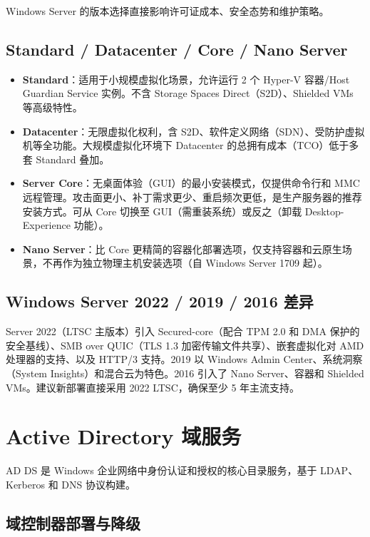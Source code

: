 \documentclass[12pt,UTF8]{ctexbook}
\begin{document}
Windows Server 的版本选择直接影响许可证成本、安全态势和维护策略。
    \subsection{Standard / Datacenter / Core / Nano Server}

\begin{itemize}
	\item \textbf{Standard}：适用于小规模虚拟化场景，允许运行 2 个 Hyper-V 容器/Host Guardian Service 实例。不含 Storage Spaces Direct（S2D）、Shielded VMs 等高级特性。
	\item \textbf{Datacenter}：无限虚拟化权利，含 S2D、软件定义网络（SDN）、受防护虚拟机等全功能。大规模虚拟化环境下 Datacenter 的总拥有成本（TCO）低于多套 Standard 叠加。
	\item \textbf{Server Core}：无桌面体验（GUI）的最小安装模式，仅提供命令行和 MMC 远程管理。攻击面更小、补丁需求更少、重启频次更低，是生产服务器的推荐安装方式。可从 Core 切换至 GUI（需重装系统）或反之（卸载 Desktop-Experience 功能）。
	\item \textbf{Nano Server}：比 Core 更精简的容器化部署选项，仅支持容器和云原生场景，不再作为独立物理主机安装选项（自 Windows Server 1709 起）。
\end{itemize}

    \subsection{Windows Server 2022 / 2019 / 2016 差异}

Server 2022（LTSC 主版本）引入 Secured-core（配合 TPM 2.0 和 DMA 保护的安全基线）、SMB over QUIC（TLS 1.3 加密传输文件共享）、嵌套虚拟化对 AMD 处理器的支持、以及 HTTP/3 支持。2019 以 Windows Admin Center、系统洞察（System Insights）和混合云为特色。2016 引入了 Nano Server、容器和 Shielded VMs。建议新部署直接采用 2022 LTSC，确保至少 5 年主流支持。

  \section{Active Directory 域服务}

AD DS 是 Windows 企业网络中身份认证和授权的核心目录服务，基于 LDAP、Kerberos 和 DNS 协议构建。

    \subsection{域控制器部署与降级}
\end{document}
